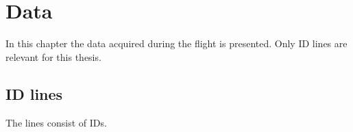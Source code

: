 \chapter{Data \label{ch:data}}
In this chapter the data acquired during the flight is presented. Only ID lines are relevant for this thesis.

\section{ID lines \label{sec:da:id_lines}}
The lines consist of IDs.